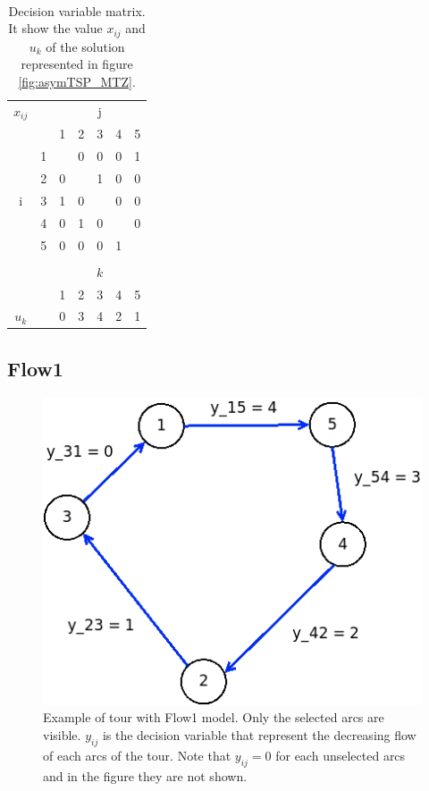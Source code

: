 \begin{table}[h!]
	\begin{center}$  $
		\caption{Decision variable matrix. It show the value $ x_{ij} $ and $ u_k $ of the solution represented in figure \ref{fig:asymTSP_MTZ}. }
		\label{tab:asymTSP_MTZ_solution}
		\begin{tabular}{cc|c|c|c|c|c|}
			 $ x_{ij} $ & \multicolumn{1}{c}{} & \multicolumn{5}{c}{j} \\ %
			& \multicolumn{1}{c}{} & \multicolumn{1}{c}{1} & \multicolumn{1}{c}{2} & \multicolumn{1}{c}{3} & \multicolumn{1}{c}{4} & \multicolumn{1}{c}{5} \\ \cline{3-7}
			\multirow{5}{*}{i} 	& 1 & \cellcolor{Black} & 0 & 0 & 0 & 1 \\ \cline{3-7}
			& 2 & 0 & \cellcolor{Black} & 1 & 0 & 0 \\ \cline{3-7}
			& 3 & 1 & 0 & \cellcolor{Black} & 0 & 0 \\ \cline{3-7}
			& 4 & 0 & 1 & 0 & \cellcolor{Black} & 0 \\ \cline{3-7}
			& 5 & 0 & 0 & 0 & 1 & \cellcolor{Black} \\ \cline{3-7}
			\multicolumn{7}{c}{} \\ 
			
			\multicolumn{2}{c}{} & \multicolumn{5}{c}{$ k $} \\  
			& \multicolumn{1}{c}{} & \multicolumn{1}{c}{1} & \multicolumn{1}{c}{2} & \multicolumn{1}{c}{3} & \multicolumn{1}{c}{4} & \multicolumn{1}{c}{5} \\ \cline{3-7}
 			$ u_k $ &  & 0 & 3 & 4 & 2 & 1 \\ \cline{3-7}
		\end{tabular}
	\end{center}
\end{table}

\subsection{Flow1}

\begin{figure}[h]
	\centering
	\includegraphics[width=.4\columnwidth]{img/asymTSP_F1_example.png}
	\caption{Example of tour with Flow1 model. Only the selected arcs are visible. $ y_{ij} $ is the decision variable that represent the decreasing flow of each arcs of the tour. Note that $ y_{ij} = 0 $ for each unselected arcs and in the figure they are not shown.}
	\label{fig:asymTSP_F1}
\end{figure}

